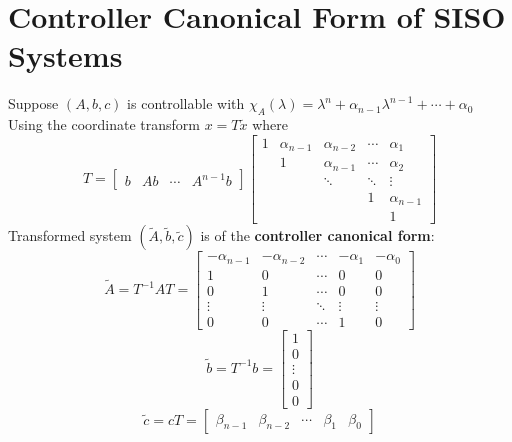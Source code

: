 \documentclass[10pt,a4paper,oneside]{article}
\begin{document}
\section{Controller Canonical Form of SISO Systems}
Suppose $(A, b, c)$ is controllable with $\chi_{A}(\lambda)=\lambda^{n}+\alpha_{n-1} \lambda^{n-1}+\cdots+\alpha_{0}$
Using the coordinate transform $x=T \tilde{x}$ where
\[
T=\left[\begin{array}{cccc}{b} & {A b} & {\cdots} & {A^{n-1} b}\end{array}\right]\left[\begin{array}{ccccc}{1} & {\alpha_{n-1}} & {\alpha_{n-2}} & {\cdots} & {\alpha_{1}} \\ {} & {1} & {\alpha_{n-1}} & {\cdots} & {\alpha_{2}} \\{}&{} {} & {\ddots} & {\ddots} & {\vdots} \\ {}&{} & {} & {1} & {\alpha_{n-1}} \\ {}&{} & {} & {} & {1}\end{array}\right]
\]
Transformed system $(\tilde{A}, \tilde{b}, \tilde{c})$ is of the {\bfseries controller canonical form}:
\[
\tilde{A}=T^{-1} A T=\left[\begin{array}{ccccc}{-\alpha_{n-1}} & {-\alpha_{n-2}} & {\cdots} & {-\alpha_{1}} & {-\alpha_{0}} \\ {1} & {0} & {\cdots} & {0} & {0} \\ {0} & {1} & {\cdots} & {0} & {0} \\ {\vdots} & {\vdots} & {\ddots} & {\vdots} & {\vdots} \\ {0} & {0} & {\cdots} & {1} & {0}\end{array}\right]
\]
\[
\tilde{b}=T^{-1} b=\left[\begin{array}{c}{1}\\{0} \\ {\vdots} \\ {0} \\ {0}\end{array}\right]
\]
\[
\tilde{c}=c T=\left[\begin{array}{lllll}{\beta_{n-1}} & {\beta_{n-2}} & {\cdots} & {\beta_{1}} & {\beta_{0}}\end{array}\right]
\]
\end{document}
